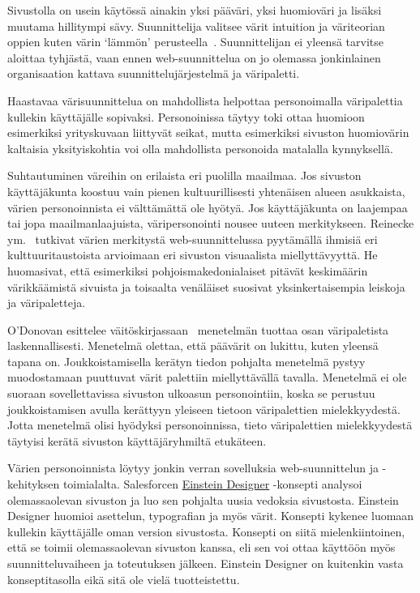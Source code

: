\documentclass[finnish, 12pt, a4paper, elec, utf8, a-1b, online]{aaltothesis}
\begin{document}
Sivustolla on usein käytössä ainakin yksi pääväri, yksi huomioväri ja
lisäksi muutama hillitympi sävy. Suunnittelija valitsee värit intuition ja
väriteorian oppien kuten värin `lämmön' perusteella~\cite{odonovan_2015}.
Suunnittelijan ei yleensä tarvitse aloittaa tyhjästä, vaan ennen
web-suunnittelua on jo olemassa jonkinlainen organisaation kattava
suunnittelujärjestelmä ja väripaletti.

Haastavaa värisuunnittelua on mahdollista helpottaa personoimalla väripalettia
kullekin käyttäjälle sopivaksi. Personoinissa täytyy toki ottaa huomioon
esimerkiksi yrityskuvaan liittyvät seikat, mutta esimerkiksi sivuston
huomiovärin kaltaisia yksityiskohtia voi olla mahdollista personoida matalalla
kynnyksellä.

Suhtautuminen väreihin on erilaista eri puolilla maailmaa. Jos sivuston
käyttäjäkunta koostuu vain pienen kultuurillisesti yhtenäisen alueen asukkaista,
värien personoinnista ei välttämättä ole hyötyä. Jos käyttäjäkunta on laajempaa
tai jopa maailmanlaajuista, väripersonointi nousee uuteen merkitykseen. Reinecke
ym.~\cite{10.1145/2556288.2557052} tutkivat värien merkitystä web-suunnittelussa
pyytämällä ihmisiä eri kulttuuritaustoista arvioimaan eri sivuston visuaalista
miellyttävyyttä. He huomasivat, että esimerkiksi pohjoismakedonialaiset pitävät
keskimäärin värikkäämistä sivuista ja toisaalta venäläiset suosivat
yksinkertaisempia leiskoja ja väripaletteja.

O'Donovan esittelee väitöskirjassaan~\cite{odonovan_2015} menetelmän tuottaa
osan väripaletista laskennallisesti. Menetelmä olettaa, että päävärit on lukittu,
kuten yleensä tapana on. Joukkoistamisella kerätyn tiedon pohjalta menetelmä
pystyy muodostamaan puuttuvat värit palettiin miellyttävällä tavalla. Menetelmä
ei ole suoraan sovellettavissa sivuston ulkoasun personointiin, koska se
perustuu joukkoistamisen avulla kerättyyn yleiseen tietoon väripalettien
mielekkyydestä. Jotta menetelmä olisi hyödyksi personoinnissa, tieto
väripalettien mielekkyydestä täytyisi kerätä sivuston käyttäjäryhmiltä
etukäteen.

Värien personoinnista löytyy jonkin verran sovelluksia web-suunnittelun ja
-kehityksen toimialalta. Salesforcen
\href{https://medium.com/salesforce-ux/einstein-designer-ai-powered-personalized-design-at-scale-367d71b85a3d}{Einstein
    Designer} -konsepti analysoi olemassaolevan sivuston ja luo sen pohjalta
uusia vedoksia sivustosta. Einstein Designer huomioi asettelun, typografian ja
myös värit. Konsepti kykenee luomaan kullekin käyttäjälle oman version
sivustosta. Konsepti on siitä mielenkiintoinen, että se toimii olemassaolevan
sivuston kanssa, eli sen voi ottaa käyttöön myös suunnitteluvaiheen ja
toteutuksen jälkeen. Einstein Designer on kuitenkin vasta konseptitasolla eikä
sitä ole vielä tuotteistettu.
\end{document}
